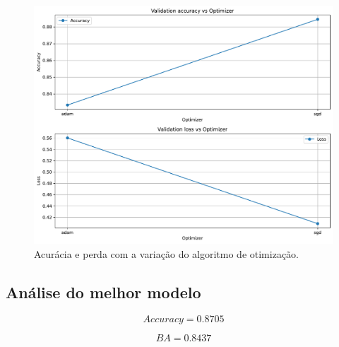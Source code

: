 \begin{figure}[H]
\centering
\includegraphics[width=0.75\linewidth]{../../plot/mlp/search_optimizer}
\caption{Acurácia e perda com a variação do algoritmo de otimização.}
\label{fig:search_optimizer}
\end{figure}

\subsection{Análise do melhor modelo}

\begin{equation}\label{eq:acc_MLP}
	Accuracy = 0.8705
\end{equation}

\begin{equation}\label{eq:ba_MLP}
	BA = 0.8437
\end{equation}


